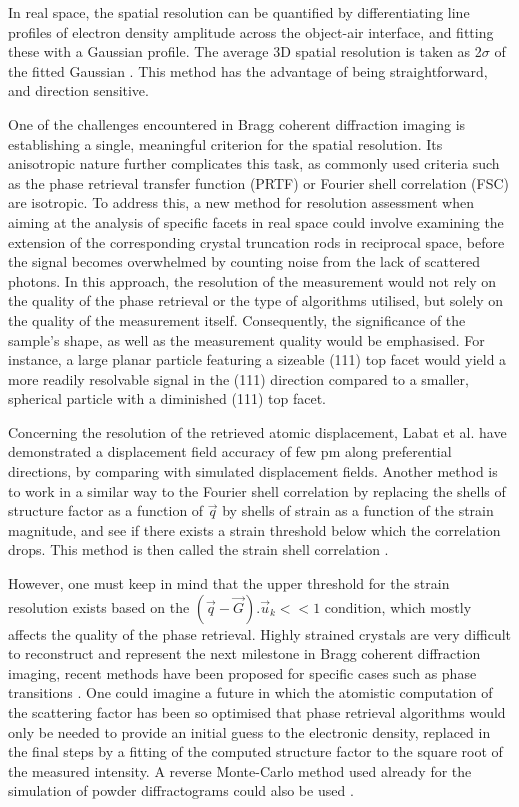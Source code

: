 In real space, the spatial resolution can be quantified by differentiating line profiles of electron density amplitude across the object-air interface, and fitting these with a Gaussian profile.
The average 3D spatial resolution is taken as 2$\sigma$ of the fitted Gaussian \parencite{Hofmann2020}.
This method has the advantage of being straightforward, and direction sensitive.

One of the challenges encountered in Bragg coherent diffraction imaging is establishing a single, meaningful criterion for the spatial resolution.
Its anisotropic nature further complicates this task, as commonly used criteria such as the phase retrieval transfer function (PRTF) or Fourier shell correlation (FSC) are isotropic.
To address this, a new method for resolution assessment when aiming at the analysis of specific facets in real space could involve examining the extension of the corresponding crystal truncation rods in reciprocal space, before the signal becomes overwhelmed by counting noise from the lack of scattered photons.
In this approach, the resolution of the measurement would not rely on the quality of the phase retrieval or the type of algorithms utilised, but solely on the quality of the measurement itself.
Consequently, the significance of the sample's shape, as well as the measurement quality would be emphasised.
For instance, a large planar particle featuring a sizeable (111) top facet would yield a more readily resolvable signal in the (111) direction compared to a smaller, spherical particle with a diminished (111) top facet.

Concerning the resolution of the retrieved atomic displacement, Labat et al. \parencite*{Labat2015} have demonstrated a displacement field accuracy of few \unit{pm} along preferential directions, by comparing with simulated displacement fields.
Another method is to work in a similar way to the Fourier shell correlation by replacing the shells of structure factor as a function of $\vec{q}$ by shells of strain as a function of the strain magnitude, and see if there exists a strain threshold below which the correlation drops.
This method is then called the strain shell correlation \parencite{Girard2020}.

However, one must keep in mind that the upper threshold for the strain resolution exists based on the $(\vec{q}-\vec{G}).\vec{u}_k<<1$ condition, which mostly affects the quality of the phase retrieval.
Highly strained crystals are very difficult to reconstruct and represent the next milestone in Bragg coherent diffraction imaging, recent methods have been proposed for specific cases such as phase transitions \parencite{Wang2020}.
One could imagine a future in which the atomistic computation of the scattering factor has been so optimised that phase retrieval algorithms would only be needed to provide an initial guess to the electronic density, replaced in the final steps by a fitting of the computed structure factor to the square root of the measured intensity.
A reverse Monte-Carlo method used already for the simulation of powder diffractograms could also be used \parencite{RLMcGreevy2001}.

